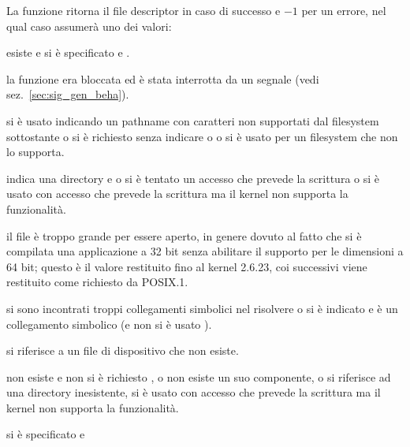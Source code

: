 \begin{funcproto}{

}

{La funzione ritorna il file descriptor in caso di successo e $-1$ per un
  errore, nel qual caso  assumerà uno dei valori:
  \begin{errlist}
  \item[\errcode{EEXIST}]  esiste e si è specificato
     e .
  \item[\errcode{EINTR}] la funzione era bloccata ed è stata interrotta da un
    segnale (vedi sez.~\ref{sec:sig_gen_beha}).
  \item[\errcode{EINVAL}] si è usato  indicando un pathname
    con caratteri non supportati dal filesystem sottostante o si è richiesto
     senza indicare  o  o si
    è usato  per un filesystem che non lo supporta.
  \item[\errcode{EISDIR}]  indica una directory e o si è
    tentato un accesso che prevede la scrittura o si è usato
     con accesso che prevede la scrittura ma il kernel non
    supporta la funzionalità.
  \item[\errcode{EFBIG}] il file è troppo grande per essere aperto, in genere
    dovuto al fatto che si è compilata una applicazione a 32 bit senza
    abilitare il supporto per le dimensioni a 64 bit; questo è il valore
    restituito fino al kernel 2.6.23, coi successivi viene restituito
     come richiesto da POSIX.1.
  \item[\errcode{ELOOP}] si sono incontrati troppi collegamenti simbolici nel
    risolvere  o si è indicato  e
     è un collegamento simbolico (e non si è usato
    ).
  \item[\errcode{ENODEV}]  si riferisce a un file di
    dispositivo che non esiste.
  \item[\errcode{ENOENT}]  non esiste e non si è richiesto
    , o non esiste un suo componente, o si riferisce ad una
    directory inesistente, si è usato  con accesso che
    prevede la scrittura ma il kernel non supporta la funzionalità.
  \item[\errcode{ENOTDIR}] si è specificato  e

\end{errlist}}
\end{funcproto}
